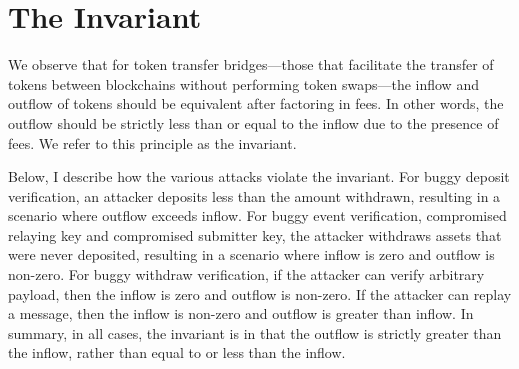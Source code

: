 \section{The Invariant}
We observe that for token transfer bridges—those that facilitate the transfer of tokens between blockchains without performing token swaps—the inflow and outflow of tokens should be equivalent after factoring in fees. In other words, the outflow should be strictly less than or equal to the inflow due to the presence of fees. We refer to this principle as the invariant.


Below, I describe how the various attacks violate the invariant. For buggy deposit verification, an attacker deposits less than the amount withdrawn, resulting in a scenario where outflow exceeds inflow. For buggy event verification, compromised relaying key and compromised submitter key, the attacker withdraws assets that were never deposited, resulting in a scenario where inflow is zero and outflow is non-zero. For buggy withdraw verification, if the attacker can verify arbitrary payload, then the inflow is zero and outflow is non-zero. If the attacker can replay a message, then the inflow is non-zero and outflow is greater than inflow. In summary, in all cases, the invariant is in that the outflow is strictly greater than the inflow, rather than equal to or less than the inflow.


